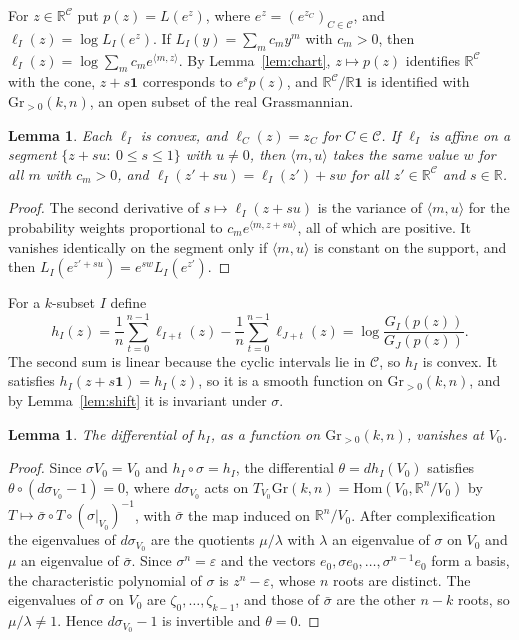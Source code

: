 \documentclass[11pt]{article}
\newtheorem{lemma}[theorem]{Lemma}
\theoremstyle{remark}
\newcommand{\Gr}{\mathrm{Gr}}
\newcommand{\R}{\mathbb{R}}
\begin{document}
For $z\in\R^{\mathcal{C}}$ put $p(z)=L(e^z)$, where $e^z=(e^{z_C})_{C\in\mathcal{C}}$, and $\ell_I(z)=\log L_I(e^z)$. If $L_I(y)=\sum_mc_my^m$ with $c_m>0$, then $\ell_I(z)=\log\sum_mc_me^{\langle m,z\rangle}$. By Lemma~\ref{lem:chart}, $z\mapsto p(z)$ identifies $\R^{\mathcal{C}}$ with the cone, $z+s\mathbf{1}$ corresponds to $e^sp(z)$, and $\R^{\mathcal{C}}/\R\mathbf{1}$ is identified with $\Gr_{>0}(k,n)$, an open subset of the real Grassmannian.

\begin{lemma}\label{lem:lse}
Each $\ell_I$ is convex, and $\ell_C(z)=z_C$ for $C\in\mathcal{C}$. If $\ell_I$ is affine on a segment $\{z+su:\ 0\le s\le1\}$ with $u\ne0$, then $\langle m,u\rangle$ takes the same value $w$ for all $m$ with $c_m>0$, and $\ell_I(z'+su)=\ell_I(z')+sw$ for all $z'\in\R^{\mathcal{C}}$ and $s\in\R$.
\end{lemma}

\begin{proof}
The second derivative of $s\mapsto\ell_I(z+su)$ is the variance of $\langle m,u\rangle$ for the probability weights proportional to $c_me^{\langle m,z+su\rangle}$, all of which are positive. It vanishes identically on the segment only if $\langle m,u\rangle$ is constant on the support, and then $L_I(e^{z'+su})=e^{sw}L_I(e^{z'})$.
\end{proof}

For a $k$-subset $I$ define
\[
h_I(z)=\frac1n\sum_{t=0}^{n-1}\ell_{I+t}(z)-\frac1n\sum_{t=0}^{n-1}\ell_{J+t}(z)=\log\frac{G_I(p(z))}{G_J(p(z))} .
\]
The second sum is linear because the cyclic intervals lie in $\mathcal{C}$, so $h_I$ is convex. It satisfies $h_I(z+s\mathbf{1})=h_I(z)$, so it is a smooth function on $\Gr_{>0}(k,n)$, and by Lemma~\ref{lem:shift} it is invariant under $\sigma$.

\begin{lemma}\label{lem:critical}
The differential of $h_I$, as a function on $\Gr_{>0}(k,n)$, vanishes at $V_0$.
\end{lemma}

\begin{proof}
Since $\sigma V_0=V_0$ and $h_I\circ\sigma=h_I$, the differential $\theta=dh_I(V_0)$ satisfies $\theta\circ(d\sigma_{V_0}-1)=0$, where $d\sigma_{V_0}$ acts on $T_{V_0}\Gr(k,n)=\mathrm{Hom}(V_0,\R^n/V_0)$ by $T\mapsto\bar\sigma\circ T\circ(\sigma|_{V_0})^{-1}$, with $\bar\sigma$ the map induced on $\R^n/V_0$. After complexification the eigenvalues of $d\sigma_{V_0}$ are the quotients $\mu/\lambda$ with $\lambda$ an eigenvalue of $\sigma$ on $V_0$ and $\mu$ an eigenvalue of $\bar\sigma$. Since $\sigma^n=\varepsilon$ and the vectors $e_0,\sigma e_0,\dots,\sigma^{n-1}e_0$ form a basis, the characteristic polynomial of $\sigma$ is $z^n-\varepsilon$, whose $n$ roots are distinct. The eigenvalues of $\sigma$ on $V_0$ are $\zeta_0,\dots,\zeta_{k-1}$, and those of $\bar\sigma$ are the other $n-k$ roots, so $\mu/\lambda\ne1$. Hence $d\sigma_{V_0}-1$ is invertible and $\theta=0$.
\end{proof}
\end{document}
